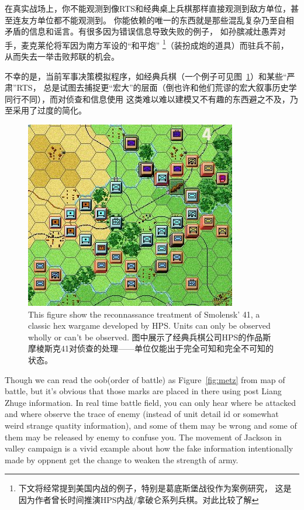 \documentclass{article}
\begin{document}
在真实战场上，你不能观测到像RTS和经典桌上兵棋那样直接观测到敌方单位，甚至连友方单位都不能观测到。
你能依赖的唯一的东西就是那些混乱复杂乃至自相矛盾的信息和谣言。有很多因为错误信息导致失败的例子，
如孙膑减灶愚弄对手，麦克莱伦将军因为南方军设的“和平炮”
\footnote{下文将经常提到美国内战的例子，特别是葛底斯堡战役作为案例研究，
这是因为作者曾长时间推演HPS内战/拿破仑系列兵棋。对此比较了解}（装扮成炮的道具）而驻兵不前，
从而失去一举击败邦联的机会。

不幸的是，当前军事决策模拟程序，如经典兵棋（一个例子可见图~\ref{fig:hps}）和某些“严肃”RTS，
总是试图去捕捉更“宏大”的层面（倒也许和他们荒谬的宏大叙事历史学同行不同），而对侦查和信息使用
这类难以难以建模又不有趣的东西避之不及，乃至采用了过度的简化。

\begin{figure}[ht]
\includegraphics[width=0.6\linewidth]{SmolenskR4.jpg}
\caption{This figure show the reconnassance treatment of Smolensk' 41, 
a classic hex wargame developed by HPS.
Units can only be observed wholly or can't be observed.
图中展示了经典兵棋公司HPS的作品斯摩棱斯克41对侦查的处理——单位仅能出于完全可知和完全不可知的状态。 }
\label{fig:hps}
\end{figure}

Though we can read the oob(order of battle) as Figure~\ref{fig:metz} from map of battle, 
but it's obvious that those marks are placed in there using post Liang Zhuge information. 
In real time battle field, you can only hear where be attacked and where observe the trace of enemy 
(instead of unit detail id or somewhat weird strange quatity information), 
and some of them may be wrong and some of them may be released by enemy to confuse you.
The movement of Jackson in valley campaign is a vivid example about how the fake information intentionally
made by oppnent get the change to weaken the strength of army.
\end{document}
